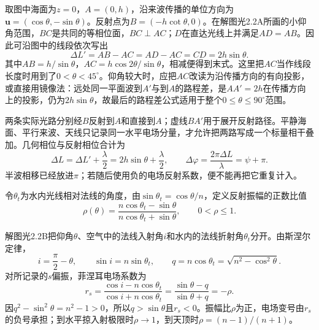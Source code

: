 \documentclass[UTF8,fontset=fandol,a4paper,11pt]{ctexart}
\newcommand{\figcaption}[1]{\par\vspace{2pt}{\small\color{muted}#1}\par}
\begin{document}
取图中海面为$z=0$，$A=(0,h)$，沿来波传播的单位方向为$\boldsymbol u=(\cos\theta,-\sin\theta)$。反射点为$B=(-h\cot\theta,0)$。在解图光2.2A所画的小仰角范围，$BC$是共同的等相位面，$BC\perp AC$；$D$在直达光线上并满足$AD=AB$。因此可沿图中的线段依次写出
\[
\Delta L'=AB-AC=AD-AC=CD=2h\sin\theta .
\]
其中$AB=h/\sin\theta$，$AC=h\cos2\theta/\sin\theta$，相减便得到末式。这里把$AC$当作线段长度时用到了$0<\theta<45^\circ$。仰角较大时，应把$AC$改读为沿传播方向的有向投影，或直接用镜像法：远处同一平面波到$A'$与到$A$的路程差，是$AA'=2h$在传播方向上的投影，仍为$2h\sin\theta$，故最后的路程差公式适用于整个$0\le\theta\le90^\circ$范围。

两条实际光路分别经$B$反射到$A$和直接到$A$；虚线$BA'$用于展开反射路径。平静海面、平行来波、天线只记录同一水平电场分量，才允许把两路写成一个标量相干叠加。几何相位与反射相位合计为
\[
\Delta L=\Delta L'+\frac{\lambda}{2}
=2h\sin\theta+\frac{\lambda}{2},\qquad
\Delta\varphi=\frac{2\pi\Delta L}{\lambda}=\psi+\pi .
\]
半波相移已经放进$\pi$；若随后使用负的电场反射系数，便不能再把它重复计入。

令$\theta_t$为水内光线相对法线的角度，由$\sin\theta_t=\cos\theta/n$，定义反射振幅的正数比值
\[
\rho(\theta)=\frac{n\cos\theta_t-\sin\theta}
{n\cos\theta_t+\sin\theta},\qquad 0<\rho\le1.
\]

解图光2.2B把仰角$\theta$、空气中的法线入射角$i$和水内的法线折射角$\theta_t$分开。由斯涅尔定律，
\[
i=\frac{\pi}{2}-\theta,\qquad
\sin i=n\sin\theta_t,\qquad
q=n\cos\theta_t=\sqrt{n^2-\cos^2\theta}.
\]
对所记录的$s$偏振，菲涅耳电场系数为
\[
r_s=\frac{\cos i-n\cos\theta_t}{\cos i+n\cos\theta_t}
=\frac{\sin\theta-q}{\sin\theta+q}=-\rho .
\]
因$q^2-\sin^2\theta=n^2-1>0$，所以$q>\sin\theta$且$r_s<0$。振幅比$\rho$为正，电场变号由$r_s$的负号承担；到水平掠入射极限时$\rho\to1$，到天顶时$\rho=(n-1)/(n+1)$。

\begin{center}\begin{minipage}{.98\linewidth}\centering
{}
\figcaption{解图光2.2B\quad 仰角、法线入射角与折射角分别标定}
\end{minipage}\end{center}
\end{document}

